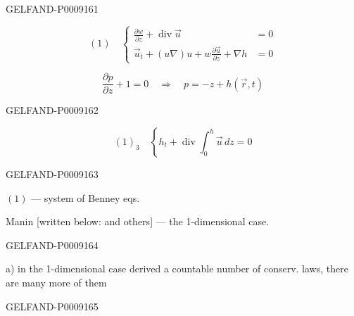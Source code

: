 \begin{GelfandAdjacentEvidence}{GELFAND-P000916}{1}

\begin{equation*}
 (1)\quad\left\{
 \begin{aligned}
 \frac{\partial w}{\partial z}+\operatorname{div}\vec u&=0\\
 \vec u_t+(u\nabla)u+w\frac{\partial\vec u}{\partial z}+\nabla h&=0
 \end{aligned}\right.
\end{equation*}

\begin{equation*}
 \frac{\partial p}{\partial z}+1=0
 \quad\Longrightarrow\quad p=-z+h(\vec r,t)
\end{equation*}
\end{GelfandAdjacentEvidence}
\begin{GelfandAdjacentEvidence}{GELFAND-P000916}{2}


\begin{equation*}
 (1)_3\quad\left\{h_t+\operatorname{div}\int_0^h\vec u\,dz=0\right.
\end{equation*}
\end{GelfandAdjacentEvidence}
\begin{GelfandAdjacentEvidence}{GELFAND-P000916}{3}


$(1)$ --- system of Benney eqs.

Manin [written below: and others] --- the 1-dimensional case.
\end{GelfandAdjacentEvidence}
\begin{GelfandAdjacentEvidence}{GELFAND-P000916}{4}


 a) in the 1-dimensional case derived a countable number of conserv. laws, there are many more of them
\end{GelfandAdjacentEvidence}
\begin{GelfandAdjacentEvidence}{GELFAND-P000916}{5}

\end{GelfandAdjacentEvidence}
